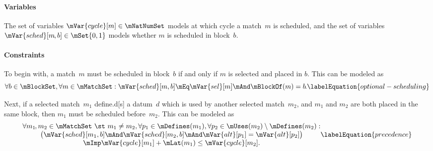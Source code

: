 \paragraph{Variables}

The set of \glspl{variable} \mbox{$\mVar{cycle}[m] \in \mNatNumSet$} models at
which cycle a \gls{match}~$m$ is scheduled, and the set of \glspl{variable}
\mbox{$\mVar{sched}[m\hspace{-.8pt}, b] \in \mSet{0, 1}$} models whether $m$ is
scheduled in \gls{block}~$b$\hspace{-1pt}.


\paragraph{Constraints}

To begin with, a \gls{match}~$m$ must be scheduled in \gls{block}~$b$ if and
only if $m$ is selected and placed in $b$\hspace{-1pt}.
%
This can be modeled as
%
\begin{equation}
  \forall b \in \mBlockSet,
  \forall m \in \mMatchSet :
  \mVar{sched}[m, b]
  \mEq
  \mVar{sel}[m] \mAnd \mBlockOf(m) = b \hspace{-1pt}.
  \labelEquation{optional-scheduling}
\end{equation}

Next, if a selected \gls{match}~$m_1$ \gls{define.d}[s] a \gls{datum}~$d$ which
is used by another selected \gls{match}~$m_2$, and $m_1$ and $m_2$ are both
placed in the same \gls{block}, then $m_1$ must be scheduled before~$m_2$.
%
This can be modeled as
%
\begin{equation}
  \begin{array}{@{}c@{}}
    \forall m_1 \hspace{-1pt}, m_2 \in \mMatchSet \text{ \st } m_1 \neq m_2,
    \forall p_1 \in \mDefines(m_1),
    \forall p_2 \in \mUses(m_2) \setminus \mDefines(m_2) : \\
    \big(
      \mVar{sched}[m_1, b] \mAnd \mVar{sched}[m_2, b]
      \mAnd \mVar{alt}[p_1] = \mVar{alt}[p_2]
    \big) \\
    \mbox{} \mImp
    \mVar{cycle}[m_1] + \mLat(m_1) \leq \mVar{cycle}[m_2].
  \end{array}
  \labelEquation{precedence}
\end{equation}

